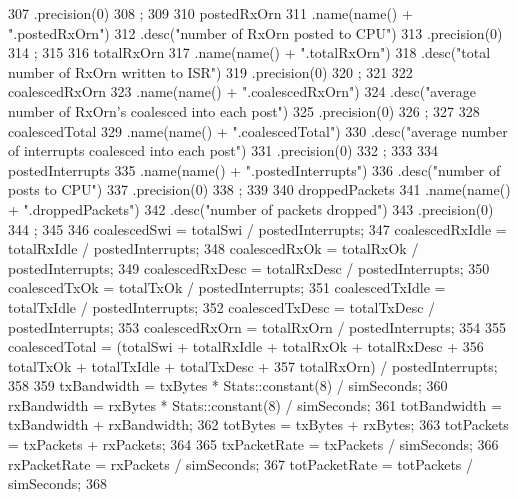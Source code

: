 \begin{DoxyCode}
{307         .precision(0)
308         ;
309 
310     postedRxOrn
311         .name(name() + ".postedRxOrn")
312         .desc("number of RxOrn posted to CPU")
313         .precision(0)
314         ;
315 
316     totalRxOrn
317         .name(name() + ".totalRxOrn")
318         .desc("total number of RxOrn written to ISR")
319         .precision(0)
320         ;
321 
322     coalescedRxOrn
323         .name(name() + ".coalescedRxOrn")
324         .desc("average number of RxOrn's coalesced into each post")
325         .precision(0)
326         ;
327 
328     coalescedTotal
329         .name(name() + ".coalescedTotal")
330         .desc("average number of interrupts coalesced into each post")
331         .precision(0)
332         ;
333 
334     postedInterrupts
335         .name(name() + ".postedInterrupts")
336         .desc("number of posts to CPU")
337         .precision(0)
338         ;
339 
340     droppedPackets
341         .name(name() + ".droppedPackets")
342         .desc("number of packets dropped")
343         .precision(0)
344         ;
345 
346     coalescedSwi = totalSwi / postedInterrupts;
347     coalescedRxIdle = totalRxIdle / postedInterrupts;
348     coalescedRxOk = totalRxOk / postedInterrupts;
349     coalescedRxDesc = totalRxDesc / postedInterrupts;
350     coalescedTxOk = totalTxOk / postedInterrupts;
351     coalescedTxIdle = totalTxIdle / postedInterrupts;
352     coalescedTxDesc = totalTxDesc / postedInterrupts;
353     coalescedRxOrn = totalRxOrn / postedInterrupts;
354 
355     coalescedTotal = (totalSwi + totalRxIdle + totalRxOk + totalRxDesc +
356                       totalTxOk + totalTxIdle + totalTxDesc +
357                       totalRxOrn) / postedInterrupts;
358 
359     txBandwidth = txBytes * Stats::constant(8) / simSeconds;
360     rxBandwidth = rxBytes * Stats::constant(8) / simSeconds;
361     totBandwidth = txBandwidth + rxBandwidth;
362     totBytes = txBytes + rxBytes;
363     totPackets = txPackets + rxPackets;
364 
365     txPacketRate = txPackets / simSeconds;
366     rxPacketRate = rxPackets / simSeconds;
367     totPacketRate = totPackets / simSeconds;
368 }
\end{DoxyCode}


